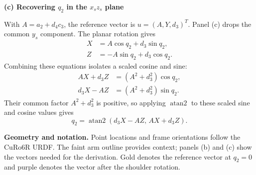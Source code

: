 \documentclass[a4paper,10pt]{article}
\newcommand{\IKPanel}[1]{\resizebox{\linewidth}{!}{}}
\begin{document}
\begin{minipage}[t]{.485\linewidth}
 {\bfseries (c) Recovering $q_2$ in the $x_sz_s$ plane}\par
 \IKPanel{ik_shoulder_projection}
\end{minipage}\hfill
\begin{minipage}[t]{.475\linewidth}
 \vspace{4mm}
 With $A=a_2+d_4c_3$, the reference vector is $u=(A,Y,d_3)^T$.
 Panel (c) drops the common $y_s$ component. The planar rotation gives
 \[
 \begin{aligned}
 X&=A\cos q_2+d_3\sin q_2,\\
 Z&=-A\sin q_2+d_3\cos q_2.
 \end{aligned}
 \]
 Combining these equations isolates a scaled cosine and sine:
 \[
 \begin{aligned}
 AX+d_3Z&=(A^2+d_3^2)\cos q_2,\\
 d_3X-AZ&=(A^2+d_3^2)\sin q_2.
 \end{aligned}
 \]
 Their common factor $A^2+d_3^2$ is positive, so applying
 $\operatorname{atan2}$ to these scaled sine and cosine values gives
 \[
 q_2=\operatorname{atan2}(d_3X-AZ,\,AX+d_3Z).
 \]
\end{minipage}

\vspace{3mm}
{\small\textbf{Geometry and notation.}
 Point locations and frame orientations follow the CuRo6R URDF. The faint arm
 outline provides context; panels (b) and (c) show the vectors needed for the
 derivation. Gold denotes the reference vector at $q_2=0$ and purple denotes
 the vector after the shoulder rotation.}
\end{document}
